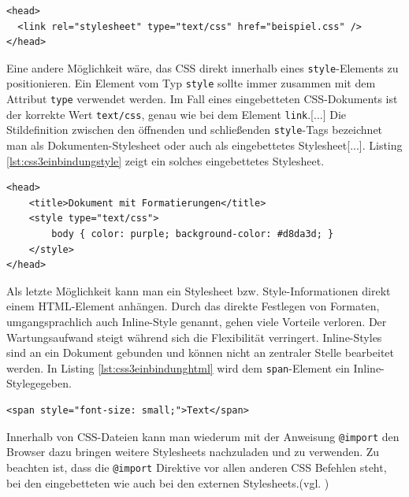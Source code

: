 \vspace{1em}
\begin{lstlisting}[language=HTML5, caption=Stylesheet Einbindung über \texttt{link}-Element, label=lst:css3einbindunglink]
<head>
  <link rel="stylesheet" type="text/css" href="beispiel.css" />
</head>
\end{lstlisting}

Eine andere Möglichkeit wäre, das CSS direkt innerhalb eines \texttt{style}-Elements zu positionieren. Ein Element vom Typ \glqq \texttt{style} sollte immer zusammen mit dem Attribut \texttt{type} verwendet werden. Im Fall eines eingebetteten CSS-Dokuments ist der korrekte Wert \texttt{text/css}, genau wie bei dem Element \texttt{link}.[...] Die Stildefinition zwischen den öffnenden und schließenden \texttt{style}-Tags bezeichnet man als Dokumenten-Stylesheet oder auch als eingebettetes Stylesheet[...].\grqq{}\cite[S.19]{MeyeCasc2005} Listing \ref{lst:css3einbindungstyle} zeigt ein solches eingebettetes Stylesheet.

\vspace{1em}
\begin{lstlisting}[language=HTML5, caption=Stylesheet Einbindung über \texttt{style}-Element, label=lst:css3einbindungstyle]
<head>
	<title>Dokument mit Formatierungen</title>
	<style type="text/css">
		body { color: purple; background-color: #d8da3d; }
	</style>
</head>
\end{lstlisting}
	
Als letzte Möglichkeit kann man ein Stylesheet bzw. Style-Informationen direkt einem HTML-Element anhängen. \glqq Durch das direkte Festlegen von Formaten, umgangsprachlich auch \glqq Inline-Style\grqq{} genannt, gehen viele Vorteile verloren. Der Wartungsaufwand steigt während sich die Flexibilität verringert. Inline-Styles sind an ein Dokument gebunden und können nicht an zentraler Stelle bearbeitet werden.\grqq{}\cite{SelfHtml20144} In Listing \ref{lst:css3einbindunghtml} wird dem \texttt{span}-Element ein \glqq Inline-Style\grqq gegeben.

\vspace{1em}
\begin{lstlisting}[language=HTML5, caption=Stylesheet Einbindung in \texttt{html}-Element, label=lst:css3einbindunghtml]
<span style="font-size: small;">Text</span>
\end{lstlisting}
	
Innerhalb von CSS-Dateien kann man wiederum mit der Anweisung \texttt{@import} den Browser dazu bringen weitere Stylesheets nachzuladen und zu verwenden. Zu beachten ist, dass die \texttt{@import} Direktive vor allen anderen CSS Befehlen steht, bei den eingebetteten wie auch bei den externen Stylesheets.(vgl. \cite[S.20]{MeyeCasc2005})

